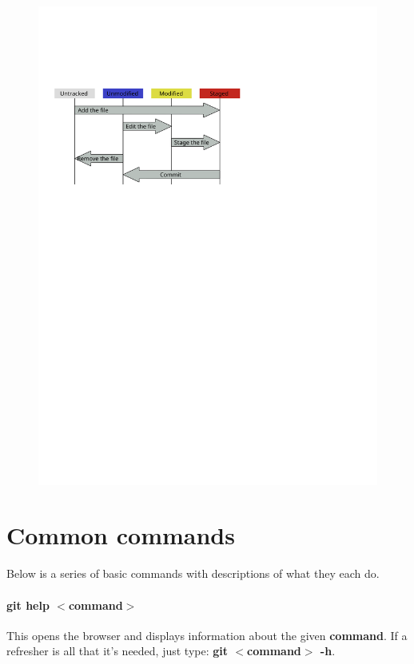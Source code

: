 \documentclass[a4paper, 12pt]{article}
\begin{document}
\vspace*{5mm}
\begin{figure}[h]
	\centering
	\includegraphics{FilesStates}
\end{figure}

\section*{Common commands}
Below is a series of basic commands with descriptions of what they each do.

\paragraph{git help $<$command$>$} This opens the browser and displays information about the given \textbf{command}. If a refresher is all that it's needed, just type: \textbf{git $<$command$>$ -h}.
\end{document}
